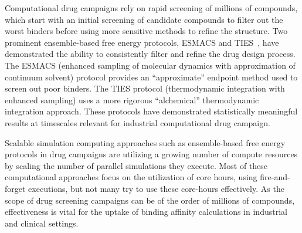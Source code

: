 
Computational drug campaigns rely on rapid screening of millions of
compounds, which start with an initial screening of candidate compounds to
filter out the worst binders before using more sensitive methods to refine
the structure. Two prominent ensemble-based free energy
protocols, ESMACS and TIES~\cite{Bhati2017}, have demonstrated the ability to
consistently filter and refine the drug design process. The ESMACS (enhanced
sampling of molecular dynamics with approximation of continuum solvent)
protocol provides an ``approximate'' endpoint method used to screen out poor
binders. The TIES protocol (thermodynamic integration with enhanced sampling)
uses a more rigorous ``alchemical'' thermodynamic integration approach. These
protocols have demonstrated statistically meaningful results at timescales
relevant for industrial computational drug campaign.


Scalable simulation computing approaches such as ensemble-based free energy
protocols in drug campaigns are utilizing a growing number of compute
resources by scaling the number of parallel simulations they execute. Most of
these computational approaches focus on the utilization of core hours, using
fire-and-forget executions, but not many try to use these core-hours
effectively. As the scope of drug screening campaigns can be of the order of
millions of compounds, effectiveness is vital for the uptake of binding
affinity calculations in industrial and clinical settings. 


 


